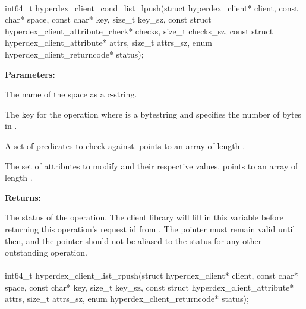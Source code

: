 \paragraph{}
\begin{ccode}
int64_t hyperdex_client_cond_list_lpush(struct hyperdex_client* client,
                const char* space,
                const char* key, size_t key_sz,
                const struct hyperdex_client_attribute_check* checks, size_t checks_sz,
                const struct hyperdex_client_attribute* attrs, size_t attrs_sz,
                enum hyperdex_client_returncode* status);
\end{ccode}
\funcdesc 

\noindent\textbf{Parameters:}
\begin{description}[labelindent=\widthof{{\code{checks}, \code{checks\_sz}}},leftmargin=*,noitemsep,nolistsep,align=right]
\item[\code{space}] The name of the space as a c-string.
\item[\code{key}, \code{key\_sz}] The key for the operation where  is a bytestring and  specifies the number of bytes in .
\item[\code{checks}, \code{checks\_sz}] A set of predicates to check against.   points to an array of length .
\item[\code{attrs}, \code{attrs\_sz}] The set of attributes to modify and their respective values.   points to an array of length .
\end{description}

\noindent\textbf{Returns:}
\begin{description}[labelindent=\widthof{{\code{status}}},leftmargin=*,noitemsep,nolistsep,align=right]
\item[\code{status}] The status of the operation.  The client library will fill in this variable before returning this operation's request id from .  The pointer must remain valid until then, and the pointer should not be aliased to the status for any other outstanding operation.
\end{description}

\paragraph{}
\begin{ccode}
int64_t hyperdex_client_list_rpush(struct hyperdex_client* client,
                const char* space,
                const char* key, size_t key_sz,
                const struct hyperdex_client_attribute* attrs, size_t attrs_sz,
                enum hyperdex_client_returncode* status);
\end{ccode}
\funcdesc 

